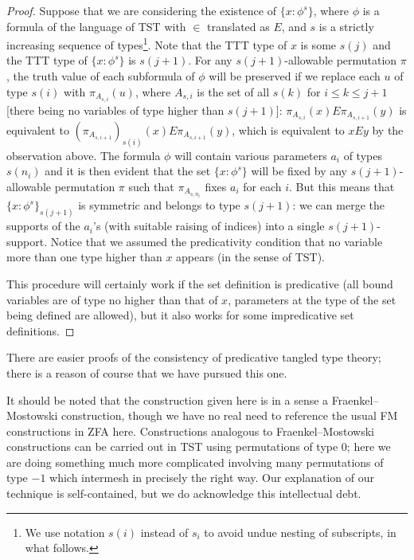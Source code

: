 \documentclass{article}
\theoremstyle{definition}
\theoremstyle{remark}
\begin{document}
{\begin{proof}
Suppose that we are considering the existence of $\{x : \phi^s\}$, where $\phi$ is a formula of the language of TST with $\in$ translated as $E$, and $s$ is a strictly increasing sequence of types\footnote{We use notation $s(i)$ instead of $s_i$ to avoid undue nesting of subscripts, in what follows.}.  Note that the TTT type of $x$ is some $s(j)$ and the TTT type of $\{x : \phi^s\}$ is $s(j+1)$.  For any $s(j+1)$-allowable permutation $\pi$, the truth value of each subformula of $\phi$ will be preserved if we replace each $u$ of type $s(i)$ with $\pi_{A_{s,i}}(u)$, where  $A_{s,i}$ is the set of all $s(k)$ for $i \leq k \leq j+1$ [there being no variables of type higher than $s(j+1)$]:  $\pi_{A_{s,i}}(x) E  \pi_{A_{s,i+1}}(y)$ is equivalent to $(\pi_{A_{s,i+1}})_{s(i)}(x) E \pi_{A_{s,i+1}}(y)$, which is equivalent to $xEy$ by the observation above. The formula $\phi$ will contain various parameters $a_i$ of types $s(n_i)$ and it is then evident that the set $\{x : \phi^s\}$ will be fixed by any $s(j+1)$-allowable permutation $\pi$ such that $\pi_{A_{s,n_i}}$ fixes $a_i$ for each $i$.  But this means that
 $\{x : \phi^s\}_{s(j+1)}$ is symmetric and belongs to type $s(j+1)$:
 we can merge the supports of the $a_i$'s (with suitable raising of indices) into a single $s(j+1)$-support.  Notice that we assumed the predicativity condition that no variable more than one type higher than $x$ appears (in the sense of TST).

This procedure will certainly work if the set definition is predicative (all bound variables are of type no higher than that of $x$, parameters at the type
of the set being defined are allowed), but it also works for some impredicative set definitions.
\end{proof}

There are easier proofs of the consistency of predicative tangled type theory;
there is a reason of course that we have pursued this one.

It should be noted that the construction given here is in a sense a Fraenkel--Mostowski construction, though we have no real need to reference the usual
FM constructions in ZFA here.  Constructions analogous to Fraenkel--Mostowski constructions can be carried out in TST using permutations of type 0;  here we are doing something much more complicated involving many permutations of type $-1$ which intermesh in precisely the right way.  Our explanation of our technique is self-contained, but we do acknowledge this intellectual debt.



}
\end{document}
